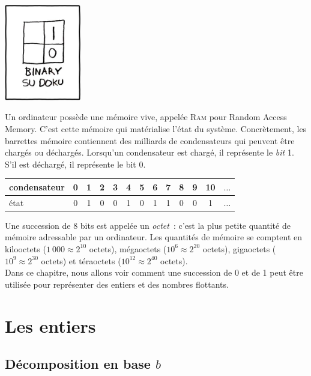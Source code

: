 \documentclass{magnoliaold}
\begin{document}
\hfill\includegraphics[width=0.25\textwidth]{../../Commun/Images/python-cours-sudoku.jpg}
\magtoc


\vspace{2ex}
Un ordinateur possède une mémoire vive, appelée \textsc{Ram} pour \og Random Access
Memory\fg. C'est cette mémoire qui matérialise l'état du système. Concrètement, les
barrettes mémoire contiennent des milliards de condensateurs qui peuvent être
chargés ou déchargés. Lorsqu'un condensateur est chargé, il représente le \emph{bit} 1. S'il est déchargé,
il représente le bit 0.

\begin{center}
\begin{tabular}{|l||c|c|c|c|c|c|c|c|c|c|c|c|}
\hline
condensateur & 0 & 1 & 2 & 3 & 4 & 5 & 6 & 7 & 8 & 9 & 10 & $\ldots$ \\
\hline
état & 0 & 1 & 0 & 0 & 1 & 0 & 1 & 1 & 0 & 0 & 1 & $\ldots$ \\
\hline
\end{tabular}
\end{center}
\noindent
Une succession de 8 bits est appelée un \emph{octet}~: c'est la plus petite quantité
de mémoire adressable par un ordinateur. Les quantités de mémoire se comptent
en kilooctets ($1\ 000\approx 2^{10}$ octets), mégaoctets ($10^6\approx 2^{20}$ octets),
gigaoctets ($10^9\approx 2^{30}$ octets) et téraoctets ($10^{12}\approx 2^{40}$ octets).\\

Dans ce chapitre, nous allons voir comment une succession de 0 et de 1 peut être
utilisée pour représenter des entiers et des nombres flottants.

\section{Les entiers}

\subsection{Décomposition en base $b$}
\end{document}
